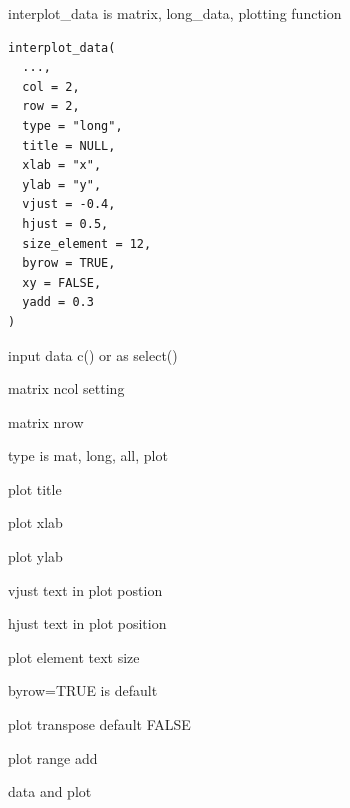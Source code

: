 \documentclass[a4paper]{book}
\begin{document}
%
\begin{Description}
interplot\_data is matrix, long\_data, plotting function
\end{Description}
%
\begin{Usage}
\begin{verbatim}
interplot_data(
  ...,
  col = 2,
  row = 2,
  type = "long",
  title = NULL,
  xlab = "x",
  ylab = "y",
  vjust = -0.4,
  hjust = 0.5,
  size_element = 12,
  byrow = TRUE,
  xy = FALSE,
  yadd = 0.3
)
\end{verbatim}
\end{Usage}
%
\begin{Arguments}
\begin{ldescription}
\item[\code{...}] input data c() or as select()

\item[\code{col}] matrix ncol setting

\item[\code{row}] matrix nrow

\item[\code{type}] type is mat, long, all, plot

\item[\code{title}] plot title

\item[\code{xlab}] plot xlab

\item[\code{ylab}] plot ylab

\item[\code{vjust}] vjust text in plot postion

\item[\code{hjust}] hjust text in plot position

\item[\code{size\_element}] plot element text size

\item[\code{byrow}] byrow=TRUE is default

\item[\code{xy}] plot transpose default FALSE

\item[\code{yadd}] plot range add
\end{ldescription}
\end{Arguments}
%
\begin{Value}
data and plot
\end{Value}
%
\end{document}
